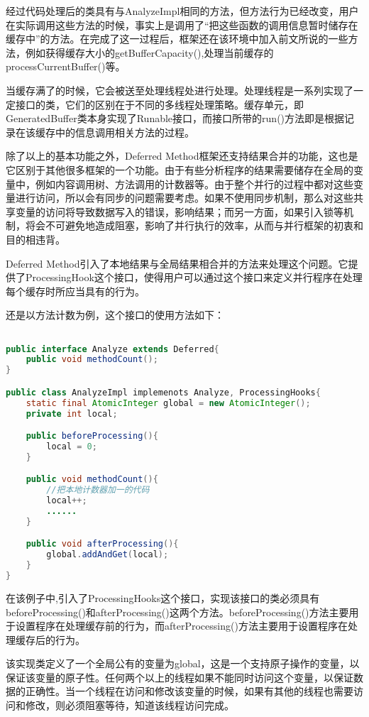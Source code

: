 经过代码处理后的类具有与AnalyzeImpl相同的方法，但方法行为已经改变，用户在实际调用这些方法的时候，事实上是调用了“把这些函数的调用信息暂时储存在缓存中”的方法。在完成了这一过程后，框架还在该环境中加入前文所说的一些方法，例如获得缓存大小的getBufferCapacity(),处理当前缓存的processCurrentBuffer()等。

当缓存满了的时候，它会被送至处理线程处进行处理。处理线程是一系列实现了一定接口的类，它们的区别在于不同的多线程处理策略。缓存单元，即GeneratedBuffer类本身实现了Runable接口，而接口所带的run()方法即是根据记录在该缓存中的信息调用相关方法的过程。

除了以上的基本功能之外，Deferred Method框架还支持结果合并的功能，这也是它区别于其他很多框架的一个功能。由于有些分析程序的结果需要储存在全局的变量中，例如内容调用树、方法调用的计数器等。由于整个并行的过程中都对这些变量进行访问，所以会有同步的问题需要考虑。如果不使用同步机制，那么对这些共享变量的访问将导致数据写入的错误，影响结果；而另一方面，如果引入锁等机制，将会不可避免地造成阻塞，影响了并行执行的效率，从而与并行框架的初衷和目的相违背。

Deferred Method引入了本地结果与全局结果相合并的方法来处理这个问题。它提供了ProcessingHook这个接口，使得用户可以通过这个接口来定义并行程序在处理每个缓存时所应当具有的行为。

还是以方法计数为例，这个接口的使用方法如下：

\begin{lstlisting}[language=Java]

public interface Analyze extends Deferred{
	public void methodCount();
}

public class AnalyzeImpl implemenots Analyze, ProcessingHooks{
	static final AtomicInteger global = new AtomicInteger();
	private int local;

	public beforeProcessing(){
		local = 0;
	}

	public void methodCount(){
		//把本地计数器加一的代码
		local++;
		......
	}

	public void afterProcessing(){
		global.addAndGet(local);
	}
}
\end{lstlisting}

在该例子中,引入了ProcessingHooks这个接口，实现该接口的类必须具有beforeProcessing()和afterProcessing()这两个方法。beforeProcessing()方法主要用于设置程序在处理缓存前的行为，而afterProcessing()方法主要用于设置程序在处理缓存后的行为。

该实现类定义了一个全局公有的变量为global，这是一个支持原子操作的变量，以保证该变量的原子性。任何两个以上的线程如果不能同时访问这个变量，以保证数据的正确性。当一个线程在访问和修改该变量的时候，如果有其他的线程也需要访问和修改，则必须阻塞等待，知道该线程访问完成。

